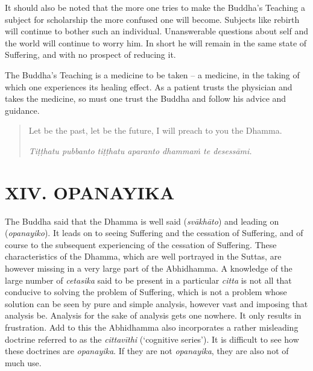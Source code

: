 It should also be noted that the more one tries to make the Buddha's Teaching a subject for scholarship the more confused one will become. Subjects like rebirth will continue to bother such an individual. Unanswerable questions about self and the world will continue to worry him. In short he will remain in the same state of Suffering, and with no prospect of reducing it.

The Buddha's Teaching is a medicine to be taken -- a medicine, in the taking of which one experiences its healing effect. As a patient trusts the physician and takes the medicine, so must one trust the Buddha and follow his advice and guidance.

\begin{quote}
Let be the past, let be the future, I will preach to you the Dhamma.

\emph{Tiṭṭhatu pubbanto tiṭṭhatu aparanto dhammaṁ te desessāmi.}
\end{quote}

\hypertarget{_xiv_opanayika}{%
\section{XIV. OPANAYIKA}\label{_xiv_opanayika}}

The Buddha said that the Dhamma is well said (\emph{svākhāto}) and leading on (\emph{opanayiko}). It leads on to seeing Suffering and the cessation of Suffering, and of course to the subsequent experiencing of the cessation of Suffering. These characteristics of the Dhamma, which are well portrayed in the Suttas, are however missing in a very large part of the Abhidhamma. A knowledge of the large number of \emph{cetasika} said to be present in a particular \emph{citta} is not all that conducive to solving the problem of Suffering, which is not a problem whose solution can be seen by pure and simple analysis, however vast and imposing that analysis be. Analysis for the sake of analysis gets one nowhere. It only results in frustration. Add to this the Abhidhamma also incorporates a rather misleading doctrine referred to as the \emph{cittavīthi} (`cognitive series'). It is difficult to see how these doctrines are \emph{opanayika}. If they are not \emph{opanayika}, they are also not of much use.
